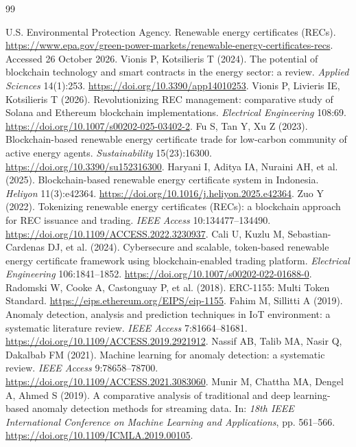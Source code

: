 \documentclass[11pt,a4paper]{article}
\begin{document}
\begin{thebibliography}{99}\small\raggedright
\setlength{\itemsep}{2pt}
\setlength{\parskip}{0pt}
 U.S. Environmental Protection Agency. Renewable energy certificates (RECs). \url{https://www.epa.gov/green-power-markets/renewable-energy-certificates-recs}. Accessed 26 October 2026.
 Vionis P, Kotsilieris T (2024). The potential of blockchain technology and smart contracts in the energy sector: a review. \emph{Applied Sciences} 14(1):253. \url{https://doi.org/10.3390/app14010253}.
 Vionis P, Livieris IE, Kotsilieris T (2026). Revolutionizing REC management: comparative study of Solana and Ethereum blockchain implementations. \emph{Electrical Engineering} 108:69. \url{https://doi.org/10.1007/s00202-025-03402-2}.
 Fu S, Tan Y, Xu Z (2023). Blockchain-based renewable energy certificate trade for low-carbon community of active energy agents. \emph{Sustainability} 15(23):16300. \url{https://doi.org/10.3390/su152316300}.
 Haryani I, Aditya IA, Nuraini AH, et al. (2025). Blockchain-based renewable energy certificate system in Indonesia. \emph{Heliyon} 11(3):e42364. \url{https://doi.org/10.1016/j.heliyon.2025.e42364}.
 Zuo Y (2022). Tokenizing renewable energy certificates (RECs): a blockchain approach for REC issuance and trading. \emph{IEEE Access} 10:134477--134490. \url{https://doi.org/10.1109/ACCESS.2022.3230937}.
 Cali U, Kuzlu M, Sebastian-Cardenas DJ, et al. (2024). Cybersecure and scalable, token-based renewable energy certificate framework using blockchain-enabled trading platform. \emph{Electrical Engineering} 106:1841--1852. \url{https://doi.org/10.1007/s00202-022-01688-0}.
 Radomski W, Cooke A, Castonguay P, et al. (2018). ERC-1155: Multi Token Standard. \url{https://eips.ethereum.org/EIPS/eip-1155}.
 Fahim M, Sillitti A (2019). Anomaly detection, analysis and prediction techniques in IoT environment: a systematic literature review. \emph{IEEE Access} 7:81664--81681. \url{https://doi.org/10.1109/ACCESS.2019.2921912}.
 Nassif AB, Talib MA, Nasir Q, Dakalbab FM (2021). Machine learning for anomaly detection: a systematic review. \emph{IEEE Access} 9:78658--78700. \url{https://doi.org/10.1109/ACCESS.2021.3083060}.
 Munir M, Chattha MA, Dengel A, Ahmed S (2019). A comparative analysis of traditional and deep learning-based anomaly detection methods for streaming data. In: \emph{18th IEEE International Conference on Machine Learning and Applications}, pp. 561--566. \url{https://doi.org/10.1109/ICMLA.2019.00105}.

\end{thebibliography}
\end{document}
